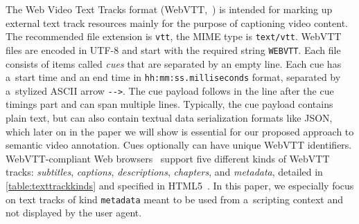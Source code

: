 \documentclass{sig-alternate}
\begin{document}
The Web Video Text Tracks format (WebVTT,~\cite{pfeiffer2013webvtt})
is intended for marking up external text track resources mainly
for the purpose of captioning video content.
The recommended file extension is \texttt{vtt},
the MIME type is \texttt{text/vtt}.
WebVTT files are encoded in UTF-8 and
start with the required string \texttt{WEBVTT}.
Each file consists of items called \emph{cues}
that are separated by an empty line.
Each cue has a~start time and an end time in
\texttt{hh:mm:ss.milliseconds} format,
separated by a~stylized ASCII arrow \texttt{-}\texttt{->}.
The cue payload follows in the line after the cue timings part
and can span multiple lines.
Typically, the cue payload contains plain text,
but can also contain textual data serialization formats like JSON,
which later on in the paper we will show is essential
for our proposed approach to semantic video annotation.
Cues optionally can have unique WebVTT identifiers.
WebVTT-compliant Web browsers~\cite{dutton2012trackelement}
support five different kinds of
WebVTT tracks: \emph{subtitles}, \emph{captions},
\emph{descriptions}, \emph{chapters}, and \emph{metadata},
detailed in \autoref{table:texttrackkinds}
and specified in HTML5~\cite{berjon2013html5}.
In this paper, we especially focus on
text tracks of kind \texttt{metadata}
meant to be used from a~scripting context and
not displayed by the user agent.
\end{document}
